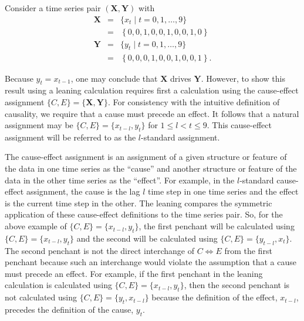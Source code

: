 Consider a time series pair $(\mathbf{X},\mathbf{Y})$ with
\begin{eqnarray*}
\mathbf{X} &=& \{x_t\; | \; t=0,1,\ldots,9\}\\
&=& \left\{0,0,1,0,0,1,0,0,1,0\right\}\\
\mathbf{Y} &=& \{y_t\; | \; t=0,1,\ldots,9\}\\
&=& \left\{0,0,0,1,0,0,1,0,0,1\right\}.
\end{eqnarray*}

Because $y_t=x_{t-1}$, one may conclude that $\mathbf{X}$ drives $\mathbf{Y}$.  However, to show this result using a leaning calculation requires first a calculation using the cause-effect assignment $\{C,E\}=\{\mathbf{X},\mathbf{Y}\}$. For consistency with the intuitive definition of causality, we require that a cause must precede an effect.  It follows that a natural assignment may be $\{C,E\}=\{x_{t-l},y_t\}$ for $1 \leq l < t \leq 9$.  This cause-effect assignment will be referred to as the $l$-standard assignment.

The cause-effect assignment is an assignment of a given structure or feature of the data in one time series as the ``cause'' and another structure or feature of the data in the other time series as the ``effect''.  For example, in the $l$-standard cause-effect assignment, the cause is the lag $l$ time step in one time series and the effect is the current time step in the other.  The leaning compares the symmetric application of these cause-effect definitions to the time series pair.  So, for the above example of $\{C,E\}=\{x_{t-l},y_t\}$, the first penchant will be calculated using $\{C,E\}=\{x_{t-l},y_t\}$ and the second will be calculated using $\{C,E\}=\{y_{t-l},x_t\}$.  The second penchant is not the direct interchange of $C\Leftrightarrow E$ from the first penchant because such an interchange would violate the assumption that a cause must precede an effect.  For example, if the first penchant in the leaning calculation is calculated using $\{C,E\}=\{x_{t-l},y_t\}$, then the second penchant is not calculated using $\{C,E\}=\{y_t,x_{t-l}\}$ because the definition of the effect, $x_{t-l}$, precedes the definition of the cause, $y_t$.

